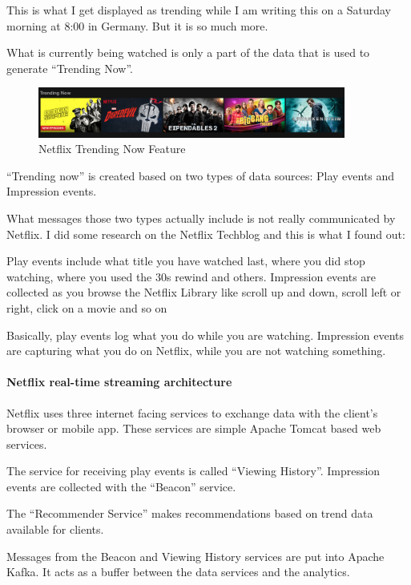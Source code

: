 \documentclass[12pt]{scrartcl} %
\begin{document}
This is what I get displayed as trending while I am writing this on a Saturday morning at 8:00 in Germany. But it is so much more.

What is currently being watched is only a part of the data that is used to generate “Trending Now”.

\begin{figure}[htbp]
  \centering
     \includegraphics[width=0.9\textwidth]{images/Netflix-Trending-Now-Screenshot}
  \caption{Netflix Trending Now Feature}
  \label{fig:Bild1}
\end{figure}

“Trending now” is created based on two types of data sources: Play events and Impression events.

What messages those two types actually include is not really communicated by Netflix. I did some research on the Netflix Techblog and this is what I found out:

Play events include what title you have watched last, where you did stop watching, where you used the 30s rewind and others.
Impression events are collected as you browse the Netflix Library like scroll up and down, scroll left or right, click on a movie and so on

Basically, play events log what you do while you are watching. Impression events are capturing what you do on Netflix, while you are not watching something.

\paragraph{Netflix real-time streaming architecture}
Netflix uses three internet facing services to exchange data with the client’s browser or mobile app. These services are simple Apache Tomcat based web services.

The service for receiving play events is called “Viewing History”. Impression events are collected with the “Beacon” service.

The “Recommender Service” makes recommendations based on trend data available for clients.

Messages from the Beacon and Viewing History services are put into Apache Kafka.
It acts as a buffer between the data services and the analytics.
\end{document}
